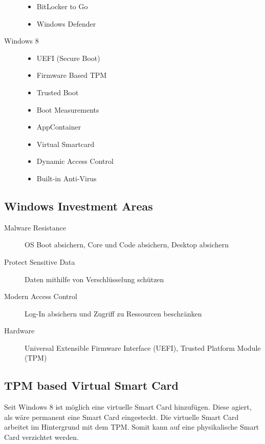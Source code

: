 \begin{description}
\begin{itemize}
        \item BitLocker to Go
        \item Windows Defender
    \end{itemize}
    \item[Windows 8]
    \begin{itemize}
        \item UEFI (Secure Boot)
        \item Firmware Based TPM
        \item Trusted Boot
        \item Boot Measurements
        \item AppContainer
        \item Virtual Smartcard
        \item Dynamic Access Control
        \item Built-in Anti-Virus
    \end{itemize}
\end{description}

\subsection{Windows Investment Areas}
\begin{description}
    \item[Malware Resistance] OS Boot absichern, Core und Code absichern, Desktop absichern
    \item[Protect Sensitive Data] Daten mithilfe von Verschlüsselung schützen
    \item[Modern Access Control] Log-In absichern und Zugriff zu Ressourcen beschränken 
    \item[Hardware] Universal Extensible Firmware Interface (UEFI), Trusted Platform Module (TPM)
\end{description}

\subsection{TPM based Virtual Smart Card}
Seit Windows 8 ist möglich eine virtuelle Smart Card hinzufügen. Diese agiert, als wäre permanent eine Smart Card eingesteckt. Die virtuelle Smart Card arbeitet im Hintergrund mit dem TPM. Somit kann auf eine physikalische Smart Card verzichtet werden.

